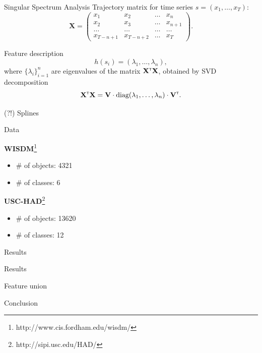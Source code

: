 \documentclass{beamer}
\newcommand{\T}{{\text{\tiny\sffamily\upshape\mdseries T}}}
\begin{document}
\begin{frame}{Singular Spectrum Analysis}
	Trajectory matrix for time series $s = (x_1, \dots, x_T)$:
	\[
		\mathbf{X} = 
		\begin{pmatrix}
			x_1 & x_2 & \dots & x_n \\
			x_2 & x_3 & \dots & x_{n+1} \\
			\dots & \dots & \dots & \dots\\
			x_{T-n+1} & x_{T-n+2} & \dots & x_{T}
		\end{pmatrix}.
	\]
	
	\begin{block}{Feature description}
		\[
			h(s_i) = (\lambda_1, \dots ,\lambda_n),
		\]
		where $\{\lambda_i\}_{i=1}^n$ are eigenvalues of the matrix $\mathbf{X}^{\T} \mathbf{X}$, obtained by SVD decomposition
		\[
			\mathbf{X}^{\T} \mathbf{X} = \mathbf{V} \cdot \text{diag} (\lambda_1, \dots, \lambda_n) \cdot \mathbf{V}^{\T}.
		\]
	\end{block}

\end{frame}
\begin{frame}{(?!) Splines}

\end{frame}
\begin{frame}{Data}

	\textbf{WISDM}\footnote{http://www.cis.fordham.edu/wisdm/}
	\begin{itemize}
		\item \# of objects: 4321
		\item \# of classes: 6
	\end{itemize}
	\textbf{USC-HAD}\footnote{http://sipi.usc.edu/HAD/}
	\begin{itemize}
		\item \# of objects: 13620
		\item \# of classes: 12
	\end{itemize}
\end{frame}
\begin{frame}{Results}

\end{frame}
\begin{frame}{Results}

\end{frame}
\begin{frame}{Feature union}

\end{frame}
\begin{frame}{Conclusion}

\end{frame}
\end{document}
